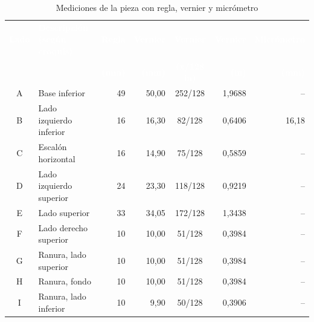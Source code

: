 \documentclass[12pt,a4paper]{article}
\newcommand{\encab}[1]{\textcolor{white}{\sffamily\bfseries #1}}
\begin{document}
\begin{table}[!htb]
	\centering
	\caption{Mediciones de la pieza con regla, vernier y
		micrómetro}\label{tab:datos}
	\small
	\setlength{\tabcolsep}{4pt}
	\begin{tabular}{c l r r c r r}
		\rowcolor{darkblue}
		\encab{Lado}    & \encab{Descripción (según croquis)} & \encab{Regla}   &
		\encab{Vernier} & \encab{Vernier}                     & \encab{Vernier} &
		\encab{Micrómetro}
		\\
		\rowcolor{darkblue}
		                &                                     & \encab{(mm)}    &
		\encab{(mm)}    & \encab{(x/128 in)}                  & \encab{(in)}    &
		\encab{(mm)}
		\\
		A               & Base inferior                       & 49              &
		50,00
		                & 252/128                             & 1,9688          & --
		\\
		B               & Lado izquierdo inferior             & 16              &
		16,30
		                & 82/128                              & 0,6406          &
		16,18
		\\
		C               & Escalón horizontal                  & 16              &
		14,90
		                & 75/128                              & 0,5859          & --
		\\
		D               & Lado izquierdo superior             & 24              &
		23,30
		                & 118/128                             & 0,9219          & --
		\\
		E               & Lado superior                       & 33              &
		34,05
		                & 172/128                             & 1,3438          & --
		\\
		F               & Lado derecho superior               & 10              &
		10,00
		                & 51/128                              & 0,3984          & --
		\\
		G               & Ranura, lado superior               & 10              &
		10,00
		                & 51/128                              & 0,3984          & --
		\\
		H               & Ranura, fondo                       & 10              &
		10,00
		                & 51/128                              & 0,3984          & --
		\\
		I               & Ranura, lado inferior               & 10              & 9,90
		                & 50/128                              & 0,3906          & --

\end{tabular}
\end{table}
\end{document}

